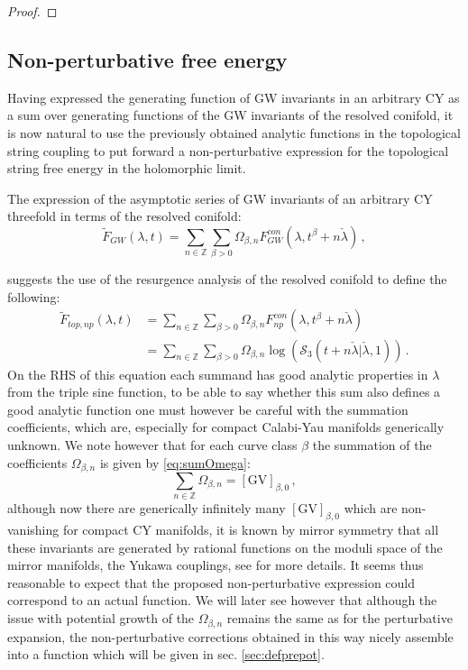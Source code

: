 \documentclass[a4paper,12pt,justification=centering]{article}
\numberwithin{equation}{section}
\theoremstyle{plain}%
\theoremstyle{definition}
\begin{document}
\begin{proof}
\end{proof}

\subsection{Non-perturbative free energy}

Having expressed the generating function of GW invariants in an arbitrary CY as a sum over generating functions of the GW invariants of the resolved conifold, it is now natural to use the previously obtained analytic functions in the topological string coupling to put forward a non-perturbative expression for the topological string free energy in the holomorphic limit.


The expression of the asymptotic series of GW invariants of an arbitrary CY threefold in terms of the resolved conifold:
\begin{equation}
\tilde{F}_{GW}(\lambda,t)= \sum_{n\in \mathbb{Z}}  \sum_{\beta>0}   \Omega_{\beta,n} F_{GW}^{con} (\lambda, t^{\beta}+ n \check{\lambda}) \,,
\end{equation}

suggests the use of the resurgence analysis of the resolved conifold to define the following:
\begin{align}
\widetilde{F}_{top,np}(\lambda,t) &= \sum_{n\in \mathbb{Z}}  \sum_{\beta>0}   \Omega_{\beta,n} F^{con}_{np} (\lambda, t^{\beta}+ n \check{\lambda}) \, \\
&= \sum_{n\in \mathbb{Z}}  \sum_{\beta>0}   \Omega_{\beta,n} \log\left( \mathcal{S}_3(t+ n \check{\lambda}| \check{\lambda},1)\right)\,.
\end{align}
On the RHS of this equation each summand has good analytic properties in $\lambda$ from the triple sine function, to be able to say whether this sum also defines a good analytic function one must however be careful with the summation coefficients, which are, especially for compact Calabi-Yau manifolds generically unknown. We note however that for each curve class $\beta$ the summation of the coefficients $\Omega_{\beta,n}$ is given by \eqref{eq:sumOmega}:
\begin{equation}
\sum_{n\in \mathbb{Z}} \Omega_{\beta,n}  = [\textrm{GV}]_{\beta,0}\,,
\end{equation}
although now there are generically infinitely many $ [\textrm{GV}]_{\beta,0}$ which are non-vanishing for compact CY manifolds, it is known by mirror symmetry that all these invariants are generated by rational functions on the moduli space of the mirror manifolds, the Yukawa couplings, see \cite{CoxKatz} for more details. It seems thus reasonable to expect that the proposed non-perturbative expression could correspond to an actual function. We will later see however that although the issue with potential growth of the $\Omega_{\beta,n}$ remains the same as for the perturbative expansion, the non-perturbative corrections obtained in this way nicely assemble into a function which will be given in sec. \ref{sec:defprepot}.
\end{document}
